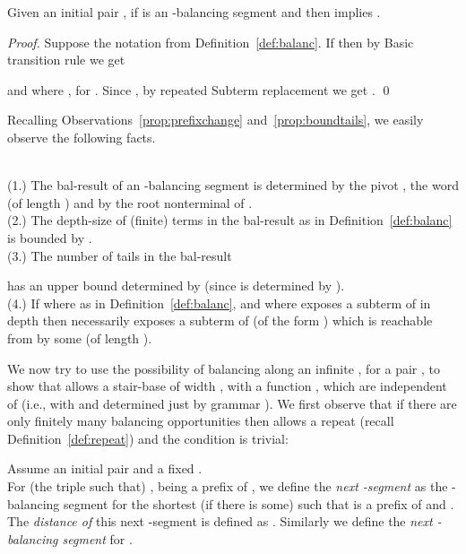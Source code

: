 \documentclass[12pt]{article}
\begin{document}
\begin{prop}\label{prop:balancelabel}
Given 
an initial pair ,
if  is an -balancing segment and
 then 
 implies
. 
\end{prop}

\begin{proof}
Suppose the notation from Definition~\ref{def:balanc}. If  
 then by Basic transition rule we get

and  
 where
, for .
Since , by repeated Subterm replacement 
we get
.
\qed
\end{proof}

\noindent
Recalling Observations~\ref{prop:prefixchange}
and~\ref{prop:boundtails}, 
we easily observe the following facts.


\begin{observ}\label{prop:balbounds}
\hfill
\\
(1.) The bal-result of an -balancing segment  is determined
by the pivot , the word  (of length ) and by
the root nonterminal of .
\\
(2.) The depth-size of (finite) terms
 in the bal-result as in 
Definition~\ref{def:balanc} 
is bounded by . 
\\
(3.) The number  of tails in the bal-result 

has an upper bound determined by  (since  is determined by
).
\\
(4.)
If 
where  as in 
Definition~\ref{def:balanc},  
and  where  exposes a subterm of  in depth 
 then  necessarily exposes a
subterm of  (of the form ) 
which is reachable from  by some  (of length
).
\end{observ}
We now try to use the possibility of balancing along
an infinite , for a pair ,
to show that 
 allows
a stair-base of width , with a function , 
which are independent of 
(i.e., with  and  determined just by grammar ).
We first observe that if there are only
finitely many balancing opportunities then
 allows a repeat (recall Definition~\ref{def:repeat})
and the condition is trivial:

\begin{defn}\label{def:nextbal}
Assume an initial pair  and a fixed 
. 
\\
For (the triple  such that)
,  being a prefix of
, we define the 
\emph{next -segment} as the -balancing segment  
for the shortest  (if there is some)
such that  is a prefix of  and . 
The \emph{distance of} this next -segment is defined as . 
Similarly we define the 
\emph{next -balancing segment} for  .
\end{defn}
\end{document}
